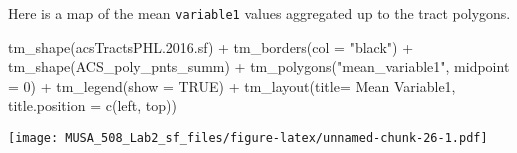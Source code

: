 \documentclass[
]{article}
\newenvironment{Shaded}{\begin{snugshade}}{\end{snugshade}}
\newcommand{\AttributeTok}[1]{\textcolor[rgb]{0.77,0.63,0.00}{#1}}
\newcommand{\ConstantTok}[1]{\textcolor[rgb]{0.00,0.00,0.00}{#1}}
\newcommand{\DecValTok}[1]{\textcolor[rgb]{0.00,0.00,0.81}{#1}}
\newcommand{\FloatTok}[1]{\textcolor[rgb]{0.00,0.00,0.81}{#1}}
\newcommand{\FunctionTok}[1]{\textcolor[rgb]{0.00,0.00,0.00}{#1}}
\newcommand{\NormalTok}[1]{#1}
\newcommand{\SpecialCharTok}[1]{\textcolor[rgb]{0.00,0.00,0.00}{#1}}
\newcommand{\StringTok}[1]{\textcolor[rgb]{0.31,0.60,0.02}{#1}}
\begin{document}
Here is a map of the mean \texttt{variable1} values aggregated up to the
tract polygons.

\begin{Shaded}
\begin{Highlighting}[]
\FunctionTok{tm\_shape}\NormalTok{(acsTractsPHL.}\FloatTok{2016.}\NormalTok{sf) }\SpecialCharTok{+}
  \FunctionTok{tm\_borders}\NormalTok{(}\AttributeTok{col =} \StringTok{"black"}\NormalTok{) }\SpecialCharTok{+}
  \FunctionTok{tm\_shape}\NormalTok{(ACS\_poly\_pnts\_summ) }\SpecialCharTok{+}
  \FunctionTok{tm\_polygons}\NormalTok{(}\StringTok{"mean\_variable1"}\NormalTok{, }\AttributeTok{midpoint =} \DecValTok{0}\NormalTok{) }\SpecialCharTok{+}
  \FunctionTok{tm\_legend}\NormalTok{(}\AttributeTok{show =} \ConstantTok{TRUE}\NormalTok{) }\SpecialCharTok{+}
  \FunctionTok{tm\_layout}\NormalTok{(}\AttributeTok{title=} \StringTok{\textquotesingle{}Mean Variable1\textquotesingle{}}\NormalTok{, }
            \AttributeTok{title.position =} \FunctionTok{c}\NormalTok{(}\StringTok{\textquotesingle{}left\textquotesingle{}}\NormalTok{, }\StringTok{\textquotesingle{}top\textquotesingle{}}\NormalTok{))}
\end{Highlighting}
\end{Shaded}

\texttt{[image: MUSA\_508\_Lab2\_sf\_files/figure-latex/unnamed-chunk-26-1.pdf]}
\end{document}
